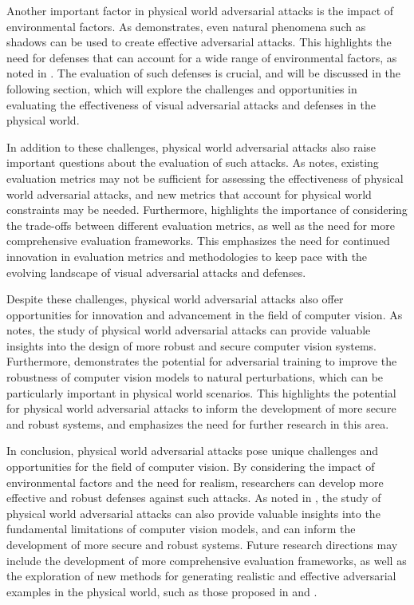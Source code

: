\documentclass[11pt,a4paper]{article}
\begin{document}
Another important factor in physical world adversarial attacks is the impact of environmental factors. As \cite{arxiv:2203.03818} demonstrates, even natural phenomena such as shadows can be used to create effective adversarial attacks. This highlights the need for defenses that can account for a wide range of environmental factors, as noted in \cite{arxiv:2408.01541}. The evaluation of such defenses is crucial, and will be discussed in the following section, which will explore the challenges and opportunities in evaluating the effectiveness of visual adversarial attacks and defenses in the physical world.

In addition to these challenges, physical world adversarial attacks also raise important questions about the evaluation of such attacks. As \cite{doi:10.1109/tpami.2025.3610085} notes, existing evaluation metrics may not be sufficient for assessing the effectiveness of physical world adversarial attacks, and new metrics that account for physical world constraints may be needed. Furthermore, \cite{doi:10.1109/sp46215.2023.10179316} highlights the importance of considering the trade-offs between different evaluation metrics, as well as the need for more comprehensive evaluation frameworks. This emphasizes the need for continued innovation in evaluation metrics and methodologies to keep pace with the evolving landscape of visual adversarial attacks and defenses.

Despite these challenges, physical world adversarial attacks also offer opportunities for innovation and advancement in the field of computer vision. As \cite{arxiv:2012.12235} notes, the study of physical world adversarial attacks can provide valuable insights into the design of more robust and secure computer vision systems. Furthermore, \cite{doi:10.1609/aaai.v35i9.16927} demonstrates the potential for adversarial training to improve the robustness of computer vision models to natural perturbations, which can be particularly important in physical world scenarios. This highlights the potential for physical world adversarial attacks to inform the development of more secure and robust systems, and emphasizes the need for further research in this area.

In conclusion, physical world adversarial attacks pose unique challenges and opportunities for the field of computer vision. By considering the impact of environmental factors and the need for realism, researchers can develop more effective and robust defenses against such attacks. As noted in \cite{arxiv:1901.10513}, the study of physical world adversarial attacks can also provide valuable insights into the fundamental limitations of computer vision models, and can inform the development of more secure and robust systems. Future research directions may include the development of more comprehensive evaluation frameworks, as well as the exploration of new methods for generating realistic and effective adversarial examples in the physical world, such as those proposed in \cite{arxiv:2305.16494} and \cite{doi:10.3389/fnbot.2023.1129720}.
\end{document}

